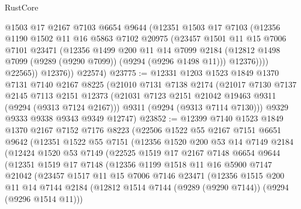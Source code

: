 \begin{lexlean}{RustCore}
\begin{coremodule}
              @1503
              @17
              @2167
              @7103
              @6654
              @9644
              (@12351
                @1503
                @17
                @7103
                (@12356
                  @1190
                  @1502
                  @11
                  @16
                  @5863
                  @7102
                  @20975
                  (@23457
                    @1501
                    @11
                    @15
                    @7006
                    @7101
                    @23471
                    (@12356
                      @1499
                      @200
                      @11
                      @14
                      @7099
                      @2184
                      (@12812 @1498 @7099 (@9289 (@9290 @7099)) (@9294 (@9296 @1498 @11)))
                      @12376))))
              @22565))
          @12376))
      @22574)
@23775 := @12331
    @1203
    @1523
    @1849
    @1370
    @7131
    @7140
    @2167
    @8225
    (@21010
      @7131
      @7138
      @2174
      (@21017
        @7130
        @7137
        @2145
        @7113
        @2151
        @12373
        (@21031 @7123 @2151 @21042 @19463 @9311 (@9294 (@9313 @7124 @2167)))
        @9311
        (@9294 (@9313 @7114 @7130)))
      @9329
      @9333
      @9338
      @9343
      @9349
      @12747)
@23852 := @12399
    @7140
    @1523
    @1849
    @1370
    @2167
    @7152
    @7176
    @8223
    (@22506
      @1522
      @55
      @2167
      @7151
      @6651
      @9642
      (@12351
        @1522
        @55
        @7151
        (@12356
          @1520
          @200
          @53
          @14
          @7149
          @2184
          (@12424
            @1520
            @53
            @7149
            (@22525
              @1519
              @17
              @2167
              @7148
              @6654
              @9644
              (@12351
                @1519
                @17
                @7148
                (@12356
                  @1199
                  @1518
                  @11
                  @16
                  @5900
                  @7147
                  @21042
                  (@23457
                    @1517
                    @11
                    @15
                    @7006
                    @7146
                    @23471
                    (@12356
                      @1515
                      @200
                      @11
                      @14
                      @7144
                      @2184
                      (@12812 @1514 @7144 (@9289 (@9290 @7144)) (@9294 (@9296 @1514 @11)))

\end{coremodule}
\end{lexlean}
